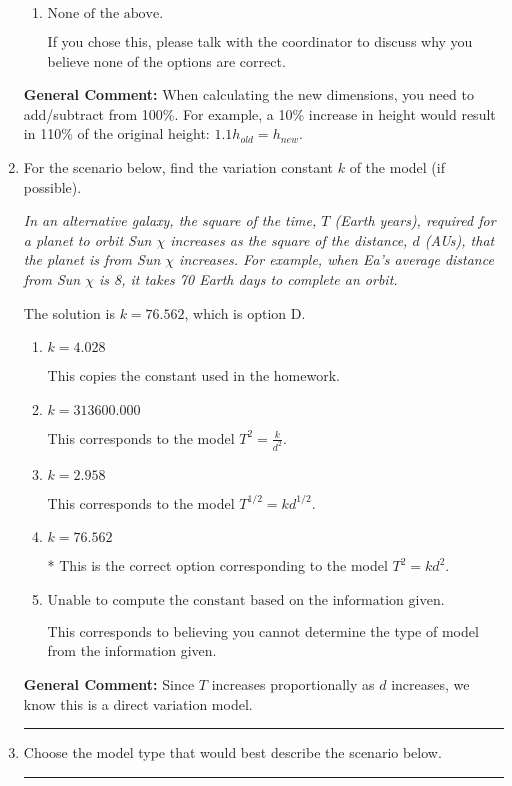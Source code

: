 \documentclass{extbook}[14pt]
\newcommand{\litem}[1]{\item #1

\rule{\textwidth}{0.4pt}}
\begin{document}
\begin{enumerate}
{\begin{enumerate}[label=\Alph*.]
* This is the correct option and corresponds to the model: $V = \pi (1.15 r)^2 (1.20 h)$.
\item \( \text{None of the above.} \)

If you chose this, please talk with the coordinator to discuss why you believe none of the options are correct.
\end{enumerate}

\textbf{General Comment:} When calculating the new dimensions, you need to add/subtract from 100\%. For example, a 10\% increase in height would result in 110\% of the original height: $1.1h_{old} = h_{new}$.
}
\litem{
For the scenario below, find the variation constant $k$ of the model (if possible).

\begin{center}
    \textit{ In an alternative galaxy, the square of the time, $T$ (Earth years), required for a planet to orbit Sun $\chi$ increases as the square of the distance, $d$ (AUs), that the planet is from Sun $\chi$ increases. For example, when Ea's average distance from Sun $\chi$ is 8, it takes 70 Earth days to complete an orbit. }
\end{center}
The solution is \( k = 76.562 \), which is option D.\begin{enumerate}[label=\Alph*.]
\item \( k = 4.028 \)

This copies the constant used in the homework.
\item \( k = 313600.000 \)

This corresponds to the model $T^{2} = \frac{k}{d^{2}}$.
\item \( k = 2.958 \)

This corresponds to the model $T^{1/2} = k d^{1/2}$.
\item \( k = 76.562 \)

* This is the correct option corresponding to the model $T^{2} = k d^{2}$.
\item \( \text{Unable to compute the constant based on the information given.} \)

This corresponds to believing you cannot determine the type of model from the information given.
\end{enumerate}

\textbf{General Comment:} Since $T$ increases proportionally as $d$ increases, we know this is a direct variation model.
}
\litem{
Choose the model type that would best describe the scenario below.

}
\end{enumerate}
\end{document}
